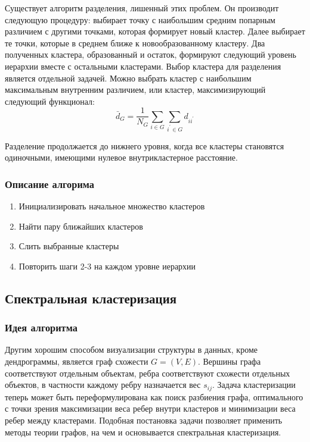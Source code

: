 Существует алгоритм разделения, лишенный этих проблем. Он производит следующую процедуру: выбирает точку с наибольшим средним попарным различием с другими точками, которая формирует новый кластер. Далее выбирает те точки, которые в среднем ближе к новообразованному кластеру. Два полученных кластера, образованный и остаток, формируют следующий уровень иерархии вместе с остальными кластерами. Выбор кластера для разделения является отдельной задачей. Можно выбрать кластер с наибольшим максимальным внутренним различием, или кластер, максимизирующий следующий функционал:
\begin{equation}
	\bar{d}_G = \frac{1}{N_G} \sum_{i \in G} \sum_{i^\prime \in G} d_{ii^\prime}
\end{equation}

Разделение продолжается до нижнего уровня, когда все кластеры становятся одиночными, имеющими нулевое внутрикластерное расстояние.

\subsubsection{Описание алгорима}
\begin{enumerate}
	\item Инициализировать начальное множество кластеров
	\item Найти пару ближайших кластеров
	\item Слить выбранные кластеры
	\item Повторить шаги 2-3 на каждом уровне иерархии
\end{enumerate}

\subsection{Спектральная кластеризация}
\subsubsection{Идея алгоритма}
Другим хорошим способом визуализации структуры в данных, кроме дендрограммы, является граф схожести $G = (V,E)$. Вершины графа соответствуют отдельным объектам, ребра соответствуют схожести отдельных объектов, в частности каждому ребру назначается вес $s_{ij}$. Задача кластеризации теперь может быть переформулирована как поиск разбиения графа, оптимального с точки зрения максимизации веса ребер внутри кластеров и минимизации веса ребер между кластерами. Подобная постановка задачи позволяет применить методы теории графов, на чем и основывается спектральная кластеризация.

